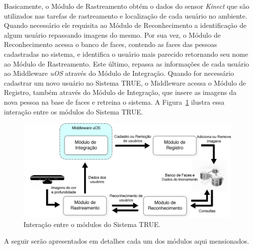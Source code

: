 Basicamente, o Módulo de Rastreamento obtém o dados do sensor \textit{Kinect} que são utilizados nas tarefas de rastreamento e localização de cada usuário no ambiente. Quando necessário ele requisita ao Módulo de Reconhecimento a identificação de algum usuário repassando imagens do mesmo. Por sua vez, o Módulo de Reconhecimento acessa o banco de faces, contendo as faces das pessoas cadastradas no sistema, e identifica o usuário mais parecido retornando seu nome ao Módulo de Rastreamento. Este último, repassa as informações de cada usuário ao Middleware \textit{uOS} através do Módulo de Integração. Quando for necessário cadastrar um novo usuário no Sistema TRUE, o Middleware acessa o Módulo de Registro, também através do Módulo de Integração, que insere as imagens da nova pessoa na base de faces e retreina o sistema. A Figura~\ref{fig:relacao-modulos} ilustra essa interação entre os módulos do Sistema TRUE.

	\begin{figure}[htb]
			\begin{center}
				\includegraphics[scale=0.5]{figuras/4.ProblemaEProposta/modulo-integracao.png}
			\end{center}
			\caption{Interação entre o módulos do Sistema TRUE.}
			\label{fig:relacao-modulos}
		\end{figure}

A seguir serão apresentados em detalhes cada um dos módulos aqui mensionados.








